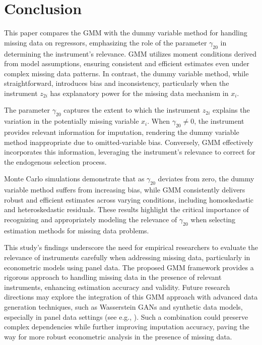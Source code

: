 \section{Conclusion}

This paper compares the GMM with the dummy variable method for handling missing data on regressors, emphasizing the role of the parameter $\gamma_{20}$ in determining the instrument's relevance. GMM utilizes moment conditions derived from model assumptions, ensuring consistent and efficient estimates even under complex missing data patterns. In contrast, the dummy variable method, while straightforward, introduces bias and inconsistency, particularly when the instrument $z_{2i}$ has explanatory power for the missing data mechanism in $x_i$.

The parameter $\gamma_{20}$ captures the extent to which the instrument $z_{2i}$ explains the variation in the potentially missing variable $x_i$. When $\gamma_{20} \neq 0$, the instrument provides relevant information for imputation, rendering the dummy variable method inappropriate due to omitted-variable bias. Conversely, GMM effectively incorporates this information, leveraging the instrument's relevance to correct for the endogenous selection process.

Monte Carlo simulations demonstrate that as $\gamma_{20}$ deviates from zero, the dummy variable method suffers from increasing bias, while GMM consistently delivers robust and efficient estimates across varying conditions, including homoskedastic and heteroskedastic residuals. These results highlight the critical importance of recognizing and appropriately modeling the relevance of $\gamma_{20}$ when selecting estimation methods for missing data problems.

This study's findings underscore the need for empirical researchers to evaluate the relevance of instruments carefully when addressing missing data, particularly in econometric models using panel data. The proposed GMM framework provides a rigorous approach to handling missing data in the presence of relevant instruments, enhancing estimation accuracy and validity.
Future research directions may explore the integration of this GMM approach with advanced data generation techniques, such as Wasserstein GANs and synthetic data models, especially in panel data settings (see e.g., \citet{athey2019, stanley2024}). Such a combination could preserve complex dependencies while further improving imputation accuracy, paving the way for more robust econometric analysis in the presence of missing data.
